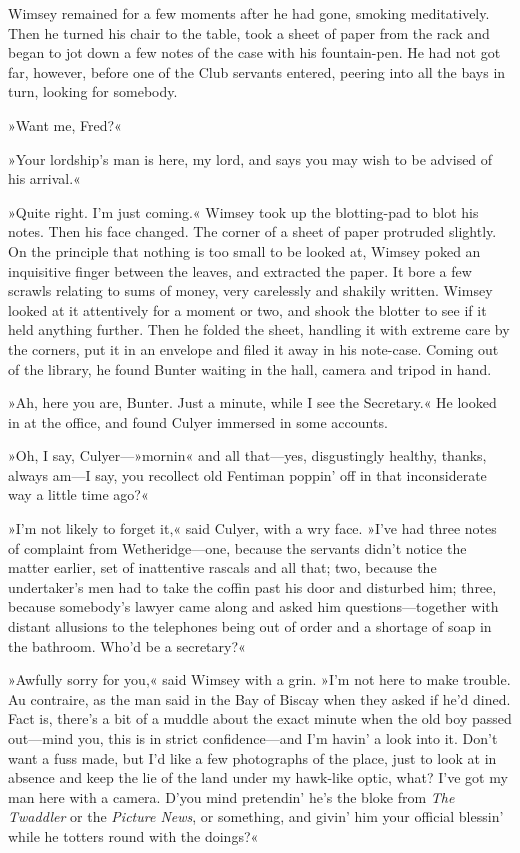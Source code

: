 Wimsey remained for a few moments after he had gone, smoking meditatively. Then he turned his chair to the table, took a sheet of paper from the rack and began to jot down a few notes of the case with his fountain-pen. He had not got far, however, before one of the Club servants entered, peering into all the bays in turn, looking for somebody.

»Want me, Fred?«

»Your lordship's man is here, my lord, and says you may wish to be advised of his arrival.«

»Quite right. I'm just coming.« Wimsey took up the blotting-pad to blot his notes. Then his face changed. The corner of a sheet of paper protruded slightly. On the principle that nothing is too small to be looked at, Wimsey poked an inquisitive finger between the leaves, and extracted the paper. It bore a few scrawls relating to sums of money, very carelessly and shakily written. Wimsey looked at it attentively for a moment or two, and shook the blotter to see if it held anything further. Then he folded the sheet, handling it with extreme care by the corners, put it in an envelope and filed it away in his note-case. Coming out of the library, he found Bunter waiting in the hall, camera and tripod in hand.

»Ah, here you are, Bunter. Just a minute, while I see the Secretary.« He looked in at the office, and found Culyer immersed in some accounts.

»Oh, I say, Culyer—»mornin« and all that—yes, disgustingly healthy, thanks, always am—I say, you recollect old Fentiman poppin' off in that inconsiderate way a little time ago?«

»I'm not likely to forget it,« said Culyer, with a wry face. »I've had three notes of complaint from Wetheridge—one, because the servants didn't notice the matter earlier, set of inattentive rascals and all that; two, because the undertaker's men had to take the coffin past his door and disturbed him; three, because somebody's lawyer came along and asked him questions—together with distant allusions to the telephones being out of order and a shortage of soap in the bathroom. Who'd be a secretary?«

»Awfully sorry for you,« said Wimsey with a grin. »I'm not here to make trouble. Au contraire, as the man said in the Bay of Biscay when they asked if he'd dined. Fact is, there's a bit of a muddle about the exact minute when the old boy passed out—mind you, this is in strict confidence—and I'm havin' a look into it. Don't want a fuss made, but I'd like a few photographs of the place, just to look at in absence and keep the lie of the land under my hawk-like optic, what? I've got my man here with a camera. D'you mind pretendin' he's the bloke from \textit{The Twaddler} or the \textit{Picture News}, or something, and givin' him your official blessin' while he totters round with the doings?«

